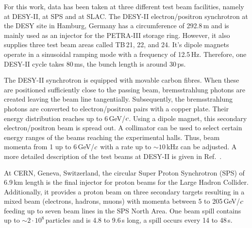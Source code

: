 
For this work, data has been taken at three different test beam facilities, namely at DESY-II, at SPS and at SLAC.
The DESY-II electron/positron synchrotron at the DESY site in Hamburg, Germany has a circumference of 292.8\,m and is mainly used as an injector for the PETRA-III storage ring. 
However, it also supplies three test beam areas called TB\,21, 22, and 24.
It's dipole magnets operate in a sinusoidal ramping mode with a frequency of 12.5\,Hz. 
Therefore, one DESY-II cycle takes 80\,ms, the bunch length is around 30\,ps. 

The DESY-II synchrotron is equipped with movable carbon fibres. 
When these are positioned sufficiently close to the passing beam, bremsstrahlung photons are created leaving the beam line tangentially.
Subsequently, the bremsstrahlung photons are converted to electron/positron pairs with a copper plate. 
Their energy distribution reaches up to 6\,GeV/$\mathnormal{c}$. 
Using a dipole magnet, this secondary electron/positron beam is spread out.
A collimator can be used to select certain energy ranges of the beams reaching the experimental halls. 
Thus, beam momenta from 1 up to 6\,GeV/$\mathnormal{c}$ with a rate up to $\sim 10$\,kHz can be adjusted. 
A more detailed description of the test beams at DESY-II is given in Ref.~\cite{EUDET-2007-11}.

At CERN, Geneva, Switzerland, the circular Super Proton Synchrotron (SPS) of 6.9\,km length is the final injector for proton beams for the Large Hadron Collider. 
Additionally, it provides a proton beam on three secondary targets resulting in a mixed beam (electrons, hadrons, muons) with momenta between 5 to 205\,GeV/$\mathnormal{c}$
 feeding up to seven beam lines in the SPS North Area. 
One beam spill contains up to $\sim 2\cdot10^8$\,particles and is 4.8 to 9.6\,s long, a spill occurs every 14 to 48\,s.\,\cite{SPS} 


